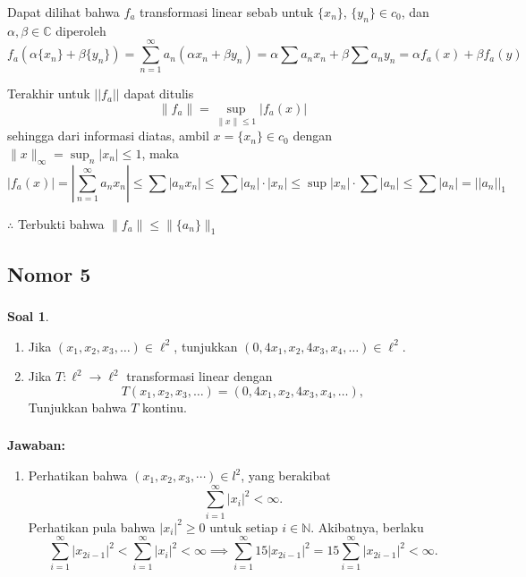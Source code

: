 \documentclass[aspectratio=169]{beamer}
\theoremstyle{definition}
\newtheorem{soal}{Soal}
\newcommand{\N}{\mathbb{N}}
\begin{document}
\begin{frame}
  \frametitle{\insertsection}
  \framesubtitle{\insertsubsection}
  Dapat dilihat bahwa $f_a$ transformasi linear sebab untuk $\{x_n\}$, $\{y_n\} \in c_0$, dan $\alpha, \beta \in \mathbb{C}$ diperoleh
$$
f_a(\alpha \{x_n\} + \beta \{y_n\}) = \sum_{n=1}^\infty a_n (\alpha x_n + \beta y_n) = \alpha \sum a_n x_n + \beta \sum a_n y_n = \alpha f_a(x) + \beta f_a(y)
$$

Terakhir untuk $||f_a||$ dapat ditulis
$$
\|f_a\| = \sup_{\|x\| \leq 1} |f_a(x)|
$$
sehingga dari informasi diatas, ambil $x = \{x_n\} \in c_0$ dengan $\|x\|_\infty = \sup_n |x_n| \leq 1$, maka
$$
|f_a(x)| = \left| \sum_{n=1}^\infty a_n x_n \right| \leq \sum |a_n x_n| \leq \sum |a_n| \cdot |x_n| \leq \sup |x_n| \cdot \sum |a_n| \leq \sum |a_n| = ||a_n||_1
$$

$\therefore$ Terbukti bahwa $\|f_a\| \leq \|\{a_n\}\|_1
$
\end{frame}

\subsection{Nomor 5}
\begin{frame}
  \frametitle{\insertsection}
  \begin{soal}
    \begin{enumerate}
        \item Jika $(x_1, x_2, x_3, \ldots) \in \ell^2$, tunjukkan $(0, 4x_1, x_2, 4x_3, x_4, \ldots) \in \ell^2$.
        \item Jika $T \colon \ell^2 \to \ell^2$ transformasi linear dengan
        \[
        T(x_1, x_2, x_3, \ldots) = (0, 4x_1, x_2, 4x_3, x_4, \ldots),
        \]
        Tunjukkan bahwa $T$ kontinu.
      \end{enumerate}
  \end{soal}
\end{frame}

\begin{frame}
  \frametitle{\insertsection}
  \framesubtitle{\insertsubsection}
  \textbf{Jawaban:}
  \begin{enumerate}
      \item Perhatikan bahwa $(x_1,x_2,x_3,\cdots)\in l^2$, yang berakibat
    \begin{equation*}
        \sum_{i=1}^\infty|x_i|^2<\infty.
    \end{equation*}
    Perhatikan pula bahwa $|x_i|^2\geq0$ untuk setiap $i\in\N$. Akibatnya, berlaku 
    \begin{equation*}
        \sum_{i=1}^\infty|x_{2i-1}|^2<\sum_{i=1}^\infty|x_i|^2<\infty\implies\sum_{i=1}^\infty15|x_{2i-1}|^2=15\sum_{i=1}^\infty|x_{2i-1}|^2<\infty.
    \end{equation*}
    \end{enumerate}
\end{frame}
\end{document}
